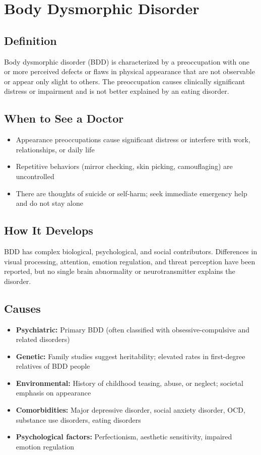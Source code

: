 \chapter{Body Dysmorphic Disorder}

\section*{Definition}
Body dysmorphic disorder (BDD) is characterized by a preoccupation with one or more perceived defects or flaws in physical appearance that are not observable or appear only slight to others. The preoccupation causes clinically significant distress or impairment and is not better explained by an eating disorder.

\section*{When to See a Doctor}

\begin{itemize}
 \item Appearance preoccupations cause significant distress or interfere with work, relationships, or daily life
 \item Repetitive behaviors (mirror checking, skin picking, camouflaging) are uncontrolled
 \item There are thoughts of suicide or self-harm; seek immediate emergency help and do not stay alone
\end{itemize}

\section*{How It Develops}
BDD has complex biological, psychological, and social contributors. Differences in visual processing, attention, emotion regulation, and threat perception have been reported, but no single brain abnormality or neurotransmitter explains the disorder.

\section*{Causes}
\begin{itemize}
 \item \textbf{Psychiatric:} Primary BDD (often classified with obsessive-compulsive and related disorders)
 \item \textbf{Genetic:} Family studies suggest heritability; elevated rates in first-degree relatives of BDD people
 \item \textbf{Environmental:} History of childhood teasing, abuse, or neglect; societal emphasis on appearance
 \item \textbf{Comorbidities:} Major depressive disorder, social anxiety disorder, OCD, substance use disorders, eating disorders
 \item \textbf{Psychological factors:} Perfectionism, aesthetic sensitivity, impaired emotion regulation
\end{itemize}

